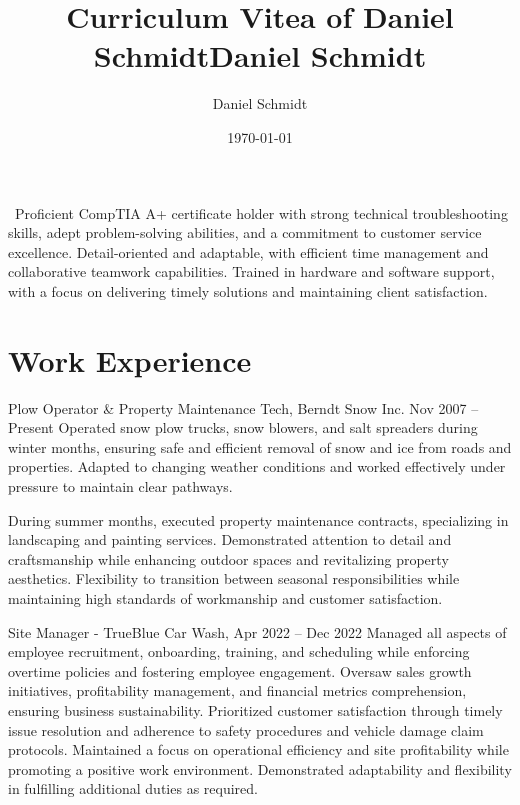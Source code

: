 \documentclass{simplecv}
\title{Curriculum Vitea of Daniel Schmidt}
\author{Daniel Schmidt}
\date{\today}
\begin{document}


\title{Daniel Schmidt}
\maketitle\
Proficient CompTIA A+ certificate holder with strong technical troubleshooting skills, adept problem-solving abilities, and a commitment to customer service excellence. Detail-oriented and adaptable, with efficient time management and collaborative teamwork capabilities. Trained in hardware and software support, with a focus on delivering timely solutions and maintaining client satisfaction.

\section{Work Experience}
\begin{topic}
\item[Plow Operator \& Property Maintenance Tech, Berndt Snow Inc. Nov 2007 -- Present]
Operated snow plow trucks, snow blowers, and salt spreaders during winter months, ensuring safe and efficient removal of snow and ice from roads and properties. Adapted to changing weather conditions and worked effectively under pressure to maintain clear pathways.

During summer months, executed property maintenance contracts, specializing in landscaping and painting services. Demonstrated attention to detail and craftsmanship while enhancing outdoor spaces and revitalizing property aesthetics. Flexibility to transition between seasonal responsibilities while maintaining high standards of workmanship and customer satisfaction.
\end{topic}

\begin{topic}
\item[Site Manager - TrueBlue Car Wash, Apr 2022 -- Dec 2022]
Managed all aspects of employee recruitment, onboarding, training, and scheduling while enforcing overtime policies and fostering employee engagement. Oversaw sales growth initiatives, profitability management, and financial metrics comprehension, ensuring business sustainability. Prioritized customer satisfaction through timely issue resolution and adherence to safety procedures and vehicle damage claim protocols. Maintained a focus on operational efficiency and site profitability while promoting a positive work environment. Demonstrated adaptability and flexibility in fulfilling additional duties as required.
\end{topic}
\end{document}
